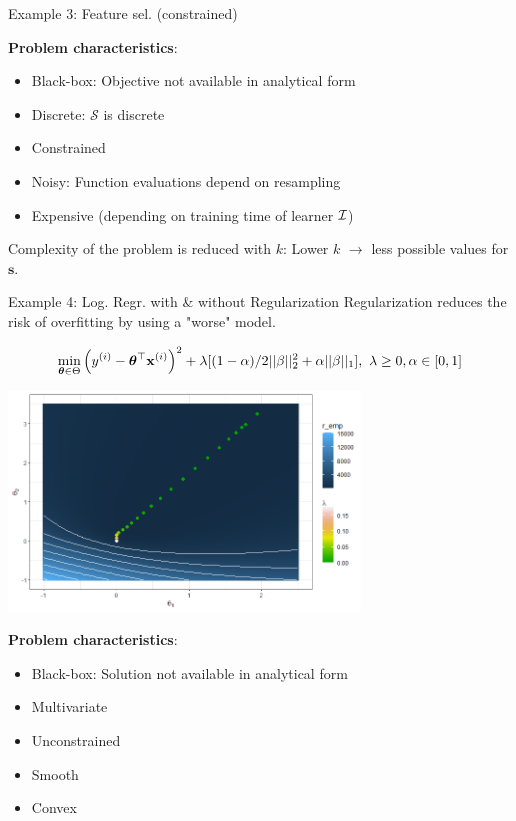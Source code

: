 \documentclass[11pt,compress,t,notes=noshow, xcolor=table]{beamer}
\begin{document}
\begin{vbframe}{Example 3: Feature sel. (constrained)}
\framebreak

\lz 

\textbf{Problem characteristics}:
\begin{itemize}
	\item Black-box: Objective not available in analytical form
	\item Discrete: $\mathcal{S}$ is discrete
	\item Constrained 
	\item Noisy: Function evaluations depend on resampling	
	\item Expensive (depending on training time of learner $\mathcal{I}$)
\end{itemize}

\lz 

Complexity of the problem is reduced with $k$: Lower $k$ $\to$ less possible values for $\bm{s}$. 

\end{vbframe}


\begin{vbframe}{Example 4: Log. Regr. with \& without Regularization}
Regularization reduces the risk of overfitting by using a "worse" model.

\begin{eqnarray*}
	\min_{\bm{\theta} \in \Theta} \left(y^{(i)} - \bm{\theta}^\top\mathbf{x}^{(i)}\right)^2 + \lambda[(1-\alpha)/2||\beta||^{2}_{2} + \alpha||\beta||_{1}],~\lambda \geq 0, \alpha \in [0,1]
\end{eqnarray*}

\begin{center}
\includegraphics[width=0.7\textwidth]{figure_man/logreg_regul.png}
\end{center}

\framebreak
\textbf{Problem characteristics}:
\begin{itemize}
	\item Black-box: Solution not available in analytical form
	\item Multivariate
	\item Unconstrained
	\item Smooth
	\item Convex
\end{itemize}

\end{vbframe}
\end{document}
